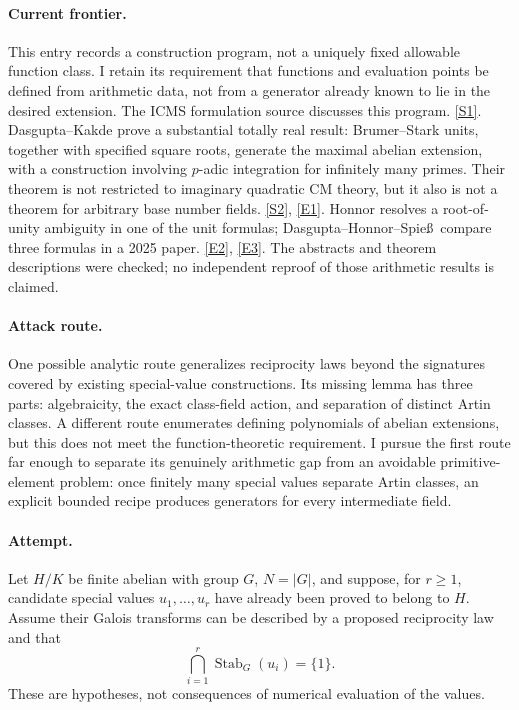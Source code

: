 \documentclass[11pt,a4paper]{article}
\newcommand{\sref}[2]{\hyperlink{source:#1:#2}{[S#2]}}
\newcommand{\eref}[2]{\hyperlink{extra:#1:#2}{[E#2]}}
\numberwithin{equation}{section}
\begin{document}
\paragraph{Current frontier.}
This entry records a construction program, not a uniquely fixed allowable
function class. I retain its requirement that functions and evaluation points
be defined from arithmetic data, not from a generator already known to lie in
the desired extension. The ICMS formulation source discusses this program.
\sref{36}{1}. Dasgupta--Kakde prove a substantial totally real result:
Brumer--Stark units, together with specified square roots, generate the maximal
abelian extension, with a construction involving $p$-adic integration for
infinitely many primes. Their theorem is not restricted to imaginary quadratic
CM theory, but it also is not a theorem for arbitrary base number fields.
\sref{36}{2}, \eref{36}{1}. Honnor resolves a root-of-unity ambiguity in one
of the unit formulas; Dasgupta--Honnor--Spie\ss\ compare three formulas in a
2025 paper. \eref{36}{2}, \eref{36}{3}. The abstracts and theorem descriptions
were checked; no independent reproof of those arithmetic results is claimed.

\paragraph{Attack route.}
One possible analytic route generalizes reciprocity laws beyond the signatures
covered by existing special-value constructions. Its missing lemma has three
parts: algebraicity, the exact class-field action, and separation of distinct
Artin classes. A different route enumerates defining polynomials of abelian
extensions, but this does not meet the function-theoretic requirement. I
pursue the first route far enough to separate its genuinely arithmetic gap
from an avoidable primitive-element problem: once finitely many special
values separate Artin classes, an explicit bounded recipe produces generators
for every intermediate field.

\paragraph{Attempt.}
Let $H/K$ be finite abelian with group $G$, $N=|G|$, and suppose, for $r\ge1$, candidate
special values $u_1,\ldots,u_r$ have already been proved to belong to $H$.
Assume their Galois transforms can be described by a proposed reciprocity law
and that
\begin{equation}\label{r36:separation}
 \bigcap_{i=1}^r\operatorname{Stab}_G(u_i)=\{1\}.
\end{equation}
These are hypotheses, not consequences of numerical evaluation of the values.
\end{document}
